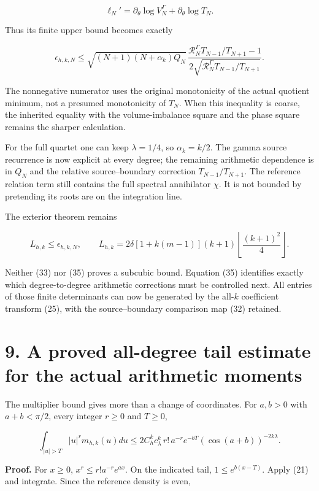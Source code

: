 \documentclass[
  11pt,
]{article}
\begin{document}
\[
\ell_N'=\partial_\theta\log V_N^\Gamma+\partial_\theta\log T_N.
\]

Thus its finite upper bound becomes exactly

\[
\boxed{
\epsilon_{h,k,N}\le
\sqrt{(N+1)(N+\alpha_k)Q_N}\,
\frac{\mathcal R_N^\Gamma T_{N-1}/T_{N+1}-1}
 {2\sqrt{\mathcal R_N^\Gamma T_{N-1}/T_{N+1}}}.
}                                                                   \tag{35}
\]

The nonnegative numerator uses the original monotonicity of the actual
quotient minimum, not a presumed monotonicity of \(T_N\). When this
inequality is coarse, the inherited equality with the volume-imbalance
square and the phase square remains the sharper calculation.

For the full quartet one can keep \(\lambda=1/4\), so \(\alpha_k=k/2\).
The gamma source recurrence is now explicit at every degree; the
remaining arithmetic dependence is in \(Q_N\) and the relative
source--boundary correction \(T_{N-1}/T_{N+1}\). The reference relation
term still contains the full spectral annihilator \(\chi\). It is not
bounded by pretending its roots are on the integration line.

The exterior theorem remains

\[
L_{h,k}\le\epsilon_{h,k,N},\qquad
L_{h,k}=2\delta[1+k(m-1)](k+1)
          \left\lfloor\frac{(k+1)^2}{4}\right\rfloor.
\]

Neither (33) nor (35) proves a subcubic bound. Equation (35) identifies
exactly which degree-to-degree arithmetic corrections must be controlled
next. All entries of those finite determinants can now be generated by
the all-\(k\) coefficient transform (25), with the source--boundary
comparison map (32) retained.

\section{9. A proved all-degree tail estimate for the actual arithmetic
moments}\label{a-proved-all-degree-tail-estimate-for-the-actual-arithmetic-moments}

The multiplier bound gives more than a change of coordinates. For
\(a,b>0\) with \(a+b<\pi/2\), every integer \(r\ge0\) and \(T\ge0\),

\[
\boxed{
\int_{|u|>T}|u|^r m_{h,k}(u)du
\le
2 C_h^k c_\lambda^k\,r!\,a^{-r}
 e^{-bT}(\cos(a+b))^{-2k\lambda}.
}                                                                   \tag{36}
\]

\textbf{Proof.} For \(x\ge0\), \(x^r\le r!a^{-r}e^{ax}\). On the
indicated tail, \(1\le e^{b(x-T)}\). Apply (21) and integrate. Since the
reference density is even,
\end{document}
